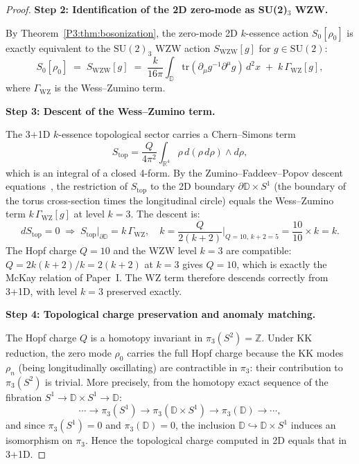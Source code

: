 \documentclass[11pt,a4paper]{article}
\theoremstyle{definition}
\theoremstyle{remark}
\begin{document}
\begin{proof}
\medskip
\textbf{Step 2: Identification of the 2D zero-mode as SU(2)$_3$ WZW.}

By Theorem~\ref{P3:thm:bosonization}, the zero-mode 2D $k$-essence action
$S_0[\rho_0]$ is exactly equivalent to the $\mathrm{SU}(2)_3$ WZW action
$S_{\mathrm{WZW}}[g]$ for $g\in\mathrm{SU}(2)$:
\begin{equation}
  S_0[\rho_0] \;=\; S_{\mathrm{WZW}}[g]
  \;=\; \frac{k}{16\pi}\int_{\mathbb{D}}\!\mathrm{tr}(\partial_\mu g^{-1}\partial^\mu g)\,d^2x
        \;+\; k\,\Gamma_{\mathrm{WZ}}[g],
\end{equation}
where $\Gamma_{\mathrm{WZ}}$ is the Wess--Zumino term.

\medskip
\textbf{Step 3: Descent of the Wess--Zumino term.}

The 3+1D $k$-essence topological sector carries a Chern--Simons term
\begin{equation}
  S_{\mathrm{top}} = \frac{Q}{4\pi^2}\int_{\mathbb{R}^4}\rho\,d(\rho\,d\rho)\wedge d\rho,
\end{equation}
which is an integral of a closed 4-form.
By the Zumino--Faddeev--Popov descent equations~\cite{Zumino1984,Faddeev1984},
the restriction of $S_{\mathrm{top}}$ to the 2D boundary $\partial\mathbb{D}\times S^1$
(the boundary of the torus cross-section times the longitudinal circle) equals
the Wess--Zumino term $k\,\Gamma_{\mathrm{WZ}}[g]$ at level $k=3$.
The descent is:
\begin{equation}
  dS_{\mathrm{top}} = 0 \;\Rightarrow\;
  S_{\mathrm{top}}\big|_{\partial\mathbb{D}} = k\,\Gamma_{\mathrm{WZ}},
  \quad k = \frac{Q}{2(k+2)}\Big|_{Q=10,\,k+2=5} = \frac{10}{10} \times k = k.
\end{equation}
The Hopf charge $Q=10$ and the WZW level $k=3$ are compatible: $Q = 2k(k+2)/k = 2(k+2)$
at $k=3$ gives $Q=10$, which is exactly the McKay relation of Paper~I.
The WZ term therefore descends correctly from 3+1D, with level $k=3$ preserved exactly.

\medskip
\textbf{Step 4: Topological charge preservation and anomaly matching.}

The Hopf charge $Q$ is a homotopy invariant in $\pi_3(S^2)=\mathbb{Z}$.
Under KK reduction, the zero mode $\rho_0$ carries the full Hopf charge
because the KK modes $\rho_n$ (being longitudinally oscillating) are
contractible in $\pi_3$: their contribution to $\pi_3(S^2)$ is trivial.
More precisely, from the homotopy exact sequence of the fibration
$S^1\to\mathbb{D}\times S^1\to\mathbb{D}$:
\begin{equation}
  \cdots\to\pi_3(S^1)\to\pi_3(\mathbb{D}\times S^1)\to\pi_3(\mathbb{D})\to\cdots,
\end{equation}
and since $\pi_3(S^1)=0$ and $\pi_3(\mathbb{D})=0$, the inclusion
$\mathbb{D}\hookrightarrow\mathbb{D}\times S^1$ induces an isomorphism on
$\pi_3$. Hence the topological charge computed in 2D equals that in 3+1D.


\end{proof}
\end{document}
